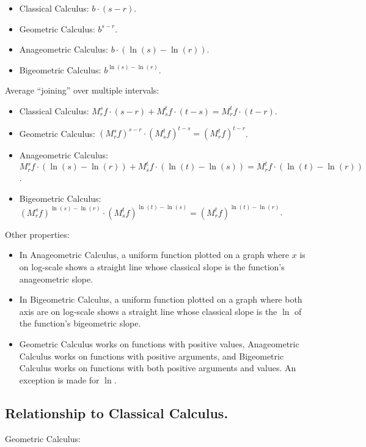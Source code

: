 \begin{itemize}
	\item Classical Calculus: $b \cdot (s - r)$.
	\item Geometric Calculus: $b^{s-r}$.
	\item Anageometric Calculus: $b \cdot (\ln(s) - \ln(r))$.
	\item Bigeometric Calculus: $b^{\ln(s) - \ln(r)}$.
\end{itemize}

Average \enquote{joining} over multiple intervals:

\begin{itemize}
	\item Classical Calculus: $M_r^s f \cdot (s - r) + M_s^t f \cdot (t - s) = M_r^t f \cdot (t - r)$.
	\item Geometric Calculus: $(M_r^s f)^{s - r} \cdot (M_s^t f)^{t - s} = (M_r^t f)^{t - r}$.
	\item Anageometric Calculus: $M_r^s f \cdot (\ln(s) - \ln(r)) + M_s^t f \cdot (\ln(t) - \ln(s)) = M_r^t f \cdot (\ln(t) - \ln(r))$.
	\item Bigeometric Calculus: $(M_r^s f)^{\ln(s) - \ln(r)} \cdot (M_s^t f)^{\ln(t) - \ln(s)} = (M_r^t f)^{\ln(t) - \ln(r)}$.
\end{itemize}

Other properties:

\begin{itemize}
	\item In Anageometric Calculus, a uniform function plotted on a graph where $x$ is on log-scale shows a straight line whose classical slope is the function's anageometric slope.
	\item In Bigeometric Calculus, a uniform function plotted on a graph where both axis are on log-scale shows a straight line whose classical slope is the $\ln$ of the function's bigeometric slope. 
	\item Geometric Calculus works on functions with positive values, Anageometric Calculus works on functions with positive arguments, and Bigeometric Calculus works on functions with both positive arguments and values. An exception is made for $\ln$.
\end{itemize}

\subsection{Relationship to Classical Calculus.}

Geometric Calculus:

